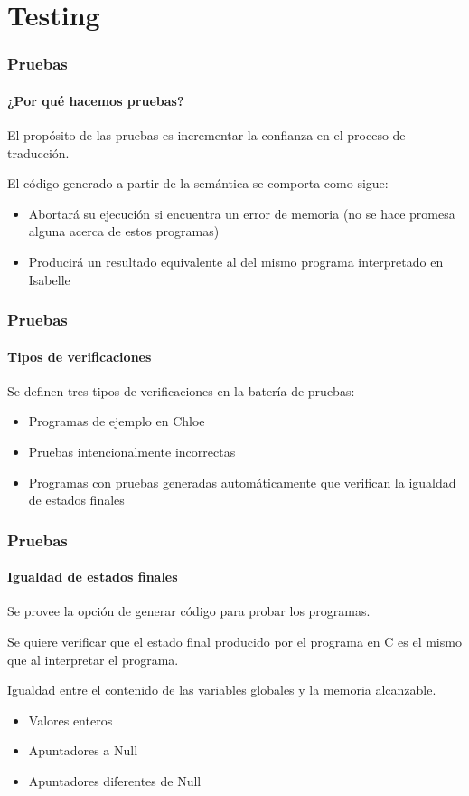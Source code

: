 \section{Testing}

\begin{frame}
\frametitle{Pruebas}
\framesubtitle{¿Por qué hacemos pruebas?}

El propósito de las pruebas es incrementar la confianza en el proceso de traducción.

\bigskip

El código generado a partir de la semántica se comporta como sigue:
\begin{itemize}
\item{Abortará su ejecución si encuentra un error de memoria (no se hace promesa alguna acerca de estos programas)}
\item{Producirá un resultado equivalente al del mismo programa interpretado en Isabelle}
\end{itemize}


\end{frame}


\begin{frame}
\frametitle{Pruebas}
\framesubtitle{Tipos de verificaciones}

Se definen tres tipos de verificaciones en la batería de pruebas:

\begin{itemize}
\item{Programas de ejemplo en Chloe}
\item{Pruebas intencionalmente incorrectas}
\item{Programas con pruebas generadas automáticamente que verifican la igualdad de estados finales}
\end{itemize}


\end{frame}


\begin{frame}
\frametitle{Pruebas}
\framesubtitle{Igualdad de estados finales}

Se provee la opción de generar código para probar los programas.

Se quiere verificar que el estado final producido por el programa en C es el mismo que al interpretar el programa.

\begin{block}{Igualdad entre el contenido de las variables globales y la memoria alcanzable.}
\begin{itemize}
\item{Valores enteros}
\item{Apuntadores a Null}
\item{Apuntadores diferentes de Null}
\end{itemize}
\end{block}


\end{frame}


